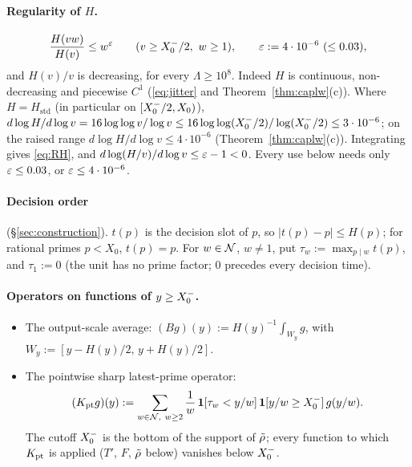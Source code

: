 \paragraph{Regularity of $H$.}
\begin{equation}\label{eq:RH}
  \frac{H(vw)}{H(v)}\le w^{\varepsilon}\qquad(v\ge X_0^{-}/2,\ w\ge 1),\qquad\varepsilon:=4\cdot10^{-6}\ (\le0.03),
\end{equation}
and $H(v)/v$ is decreasing, for every $\Lambda\ge10^8$. Indeed $H$ is continuous, non-decreasing and piecewise $C^1$
(\eqref{eq:jitter} and Theorem~\ref{thm:caplw}(c)). Where $H=H_{\mathrm{std}}$ (in particular on $[X_0^{-}/2,X_0)$),
$d\log H/d\log v=16\log\log v/\log v\le16\log\log(X_0^{-}/2)/\log(X_0^{-}/2)\le3\cdot10^{-6}$; on the raised range
$d\log H/d\log v\le4\cdot10^{-6}$ (Theorem~\ref{thm:caplw}(c)). Integrating gives \eqref{eq:RH}, and $d\log(H/v)/d\log v\le\varepsilon-1<0$.
Every use below needs only $\varepsilon\le0.03$, or $\varepsilon\le4\cdot10^{-6}$.

\paragraph{Decision order} (\S\ref{sec:construction}). $t(p)$ is the decision slot of $p$, so $|t(p)-p|\le H(p)$; for
rational primes $p<X_0$, $t(p)=p$. For $w\in\mathcal{N}$, $w\ne1$, put $\tau_w:=\max_{p\mid w}t(p)$, and $\tau_1:=0$ (the
unit has no prime factor; $0$ precedes every decision time).

\paragraph{Operators on functions of $y\ge X_0^{-}$.}
\begin{itemize}
\item The output-scale average: $(Bg)(y):=H(y)^{-1}\int_{W_y}g$, with $W_y:=[y-H(y)/2,\,y+H(y)/2]$.
\item The pointwise sharp latest-prime operator:
  \[
    (K_{\mathrm{pt}} g)(y):=\sum_{w\in\mathcal{N},\ w\ge 2}\frac1w\,\mathbf 1[\tau_w<y/w]\,\mathbf 1[y/w\ge X_0^{-}]\,g(y/w).
  \]
  The cutoff $X_0^{-}$ is the bottom of the support of $\tilde\rho$; every function to which $K_{\mathrm{pt}}$ is applied ($T'$, $F$,
  $\tilde\rho$ below) vanishes below $X_0^{-}$.
\end{itemize}

